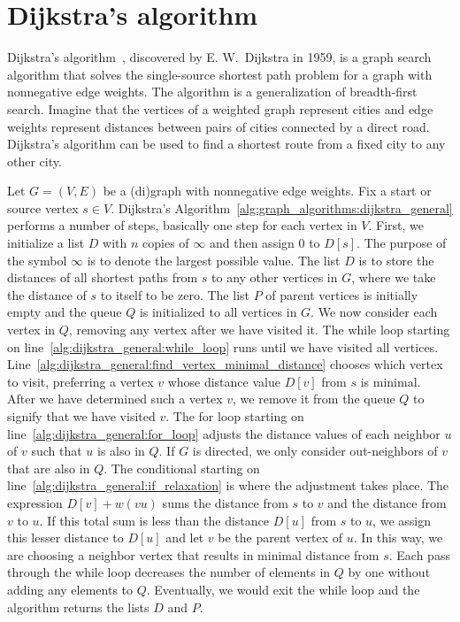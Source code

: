 
\section{Dijkstra's algorithm}
\label{sec:graph_algorithms:Dijkstra_algorithm}

Dijkstra's algorithm~\cite{Dijkstra1959}, discovered by
E. W.~Dijkstra in 1959, is a graph search
algorithm that solves the single-source shortest
path problem for a graph with
nonnegative edge weights. The algorithm is a
generalization of breadth-first
search. Imagine that the vertices of a weighted graph represent cities
and edge weights represent distances between pairs of
cities connected by a direct road. Dijkstra's
algorithm can be used to find a shortest
route from a fixed city to any other city.

Let $G = (V,E)$ be a (di)graph with nonnegative edge
weights. Fix a start or source
vertex $s \in V$. Dijkstra's
Algorithm~\ref{alg:graph_algorithms:dijkstra_general} performs a
number of steps, basically one step for each vertex in $V$. First, we
initialize a list $D$ with $n$ copies of $\infty$ and then assign $0$
to $D[s]$. The purpose of the symbol $\infty$ is to denote the largest
possible value. The list $D$ is to store the distances
of all shortest paths from $s$ to any other
vertices in $G$, where we take the distance of $s$ to itself to be
zero. The list $P$ of parent vertices is initially empty and the
queue $Q$ is initialized to all vertices in $G$. We now
consider each vertex in $Q$, removing any vertex after we have visited
it. The while loop starting on
line~\ref{alg:dijkstra_general:while_loop} runs until we have visited
all vertices.
Line~\ref{alg:dijkstra_general:find_vertex_minimal_distance} chooses
which vertex to visit, preferring a vertex $v$ whose distance value
$D[v]$ from $s$ is minimal. After we have
determined such a vertex $v$, we remove it from the queue
$Q$ to signify that we have visited $v$. The for loop starting on
line~\ref{alg:dijkstra_general:for_loop} adjusts the distance values
of each neighbor $u$ of $v$ such that $u$ is also in $Q$. If $G$ is
directed, we only consider out-neighbors of $v$
that are also in $Q$. The conditional starting on
line~\ref{alg:dijkstra_general:if_relaxation} is where the adjustment
takes place. The expression $D[v] + w(vu)$ sums the distance from $s$
to $v$ and the distance from $v$ to $u$. If this total sum is less
than the distance $D[u]$ from $s$ to $u$, we assign this lesser
distance to $D[u]$ and let $v$ be the parent vertex of $u$. In this
way, we are choosing a neighbor vertex that results in minimal
distance from $s$. Each pass through the while
loop decreases the number of elements in $Q$ by one without adding any
elements to $Q$. Eventually, we would exit the while loop and the
algorithm returns the lists $D$ and $P$.

